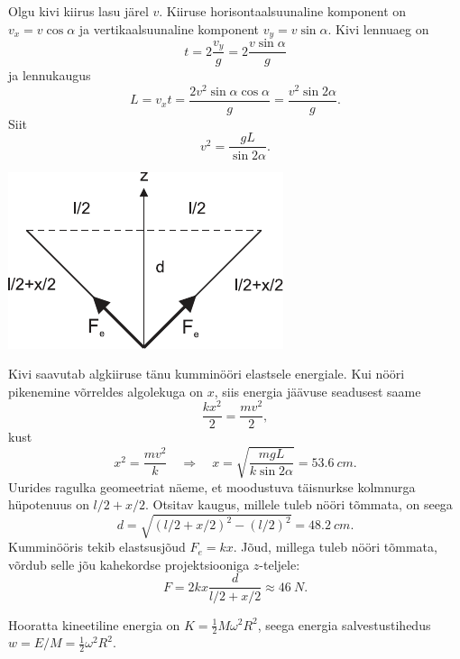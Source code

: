 \documentclass[10pt]{article}
\begin{document}
{
\solu
Olgu kivi kiirus lasu järel $v$. Kiiruse horisontaalsuunaline komponent on $v_x = v \cos \alpha$ ja vertikaalsuunaline komponent $v_y = v \sin \alpha$. Kivi lennuaeg on
\[
t = 2 \frac{v_y}{g} = 2 \frac{v\sin\alpha}{g}
\]
ja lennukaugus
\[
L=v_{x} t=\frac{2 v^{2} \sin \alpha \cos \alpha}{g}=\frac{v^{2} \sin 2 \alpha}{g}.
\]
Siit
\[
v^2 = \frac{gL}{\sin 2\alpha}.
\]

\begin{center}
	\includegraphics[width=0.5\linewidth]{2006-v3g-03-lah}
\end{center}

Kivi saavutab algkiiruse tänu kumminööri elastsele energiale. Kui nööri pikenemine võrreldes algolekuga on $x$, siis energia jäävuse seadusest saame
\[
\frac{k x^{2}}{2}=\frac{m v^{2}}{2},
\]
kust
\[
x^{2}=\frac{m v^{2}}{k} \quad\Rightarrow\quad x=\sqrt{\frac{m g L}{k \sin 2 \alpha}}=\SI{53,6}{cm}.
\]
Uurides ragulka geomeetriat näeme, et moodustuva täisnurkse kolmnurga hüpotenuus on $l/2+x/2$. Otsitav kaugus, millele tuleb nööri tõmmata, on seega
\[
d=\sqrt{(l / 2+x / 2)^{2}-(l / 2)^{2}}=\SI{48.2}{cm}.
\]
Kumminööris tekib elastsusjõud $F_e = kx$. Jõud, millega tuleb nööri tõmmata, võrdub selle jõu kahekordse projektsiooniga $z$-teljele:
\[
F=2 k x \frac{d}{l / 2+x/2} \approx \SI{46}{N}.
\]
\probend
\bigskip


\solu
\osa Hooratta kineetiline energia on $K = \frac{1}{2}M\omega^2R^2$, seega energia salvestustihedus $w = E/M = \frac{1}{2} \omega^2R^2$.

}
\end{document}
